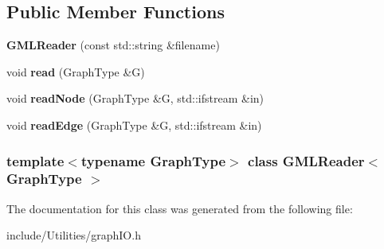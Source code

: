 \subsection*{Public Member Functions}
\begin{DoxyCompactItemize}
\item 
\hypertarget{class_g_m_l_reader_a1005acc20d242aea08d54a21ca95fa48}{
{\bfseries GMLReader} (const std::string \&filename)}
\label{class_g_m_l_reader_a1005acc20d242aea08d54a21ca95fa48}

\item 
\hypertarget{class_g_m_l_reader_a350beeacb1d55d4eacd2d0e8e57fab6a}{
void {\bfseries read} (GraphType \&G)}
\label{class_g_m_l_reader_a350beeacb1d55d4eacd2d0e8e57fab6a}

\item 
\hypertarget{class_g_m_l_reader_a95876c78633501285f65500964afbb63}{
void {\bfseries readNode} (GraphType \&G, std::ifstream \&in)}
\label{class_g_m_l_reader_a95876c78633501285f65500964afbb63}

\item 
\hypertarget{class_g_m_l_reader_a9b5855050d7aa9d8a25a3bcb10ad700b}{
void {\bfseries readEdge} (GraphType \&G, std::ifstream \&in)}
\label{class_g_m_l_reader_a9b5855050d7aa9d8a25a3bcb10ad700b}

\end{DoxyCompactItemize}
\subsubsection*{template$<$typename GraphType$>$ class GMLReader$<$ GraphType $>$}



The documentation for this class was generated from the following file:\begin{DoxyCompactItemize}
\item 
include/Utilities/graphIO.h\end{DoxyCompactItemize}
